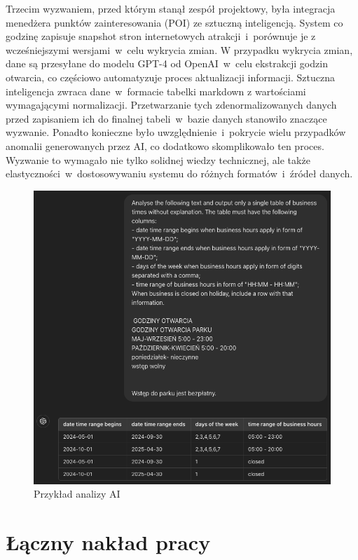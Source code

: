 Trzecim wyzwaniem, przed którym stanął zespół projektowy, była integracja menedżera punktów zainteresowania (POI) ze sztuczną inteligencją.
System co godzinę zapisuje snapshot stron internetowych atrakcji~i~porównuje je z wcześniejszymi wersjami~w~celu wykrycia zmian.
W przypadku wykrycia zmian, dane są przesyłane do modelu GPT-4 od OpenAI~w~celu ekstrakcji godzin otwarcia, co częściowo automatyzuje proces aktualizacji informacji.
Sztuczna inteligencja zwraca dane~w~formacie tabelki markdown z wartościami wymagającymi normalizacji.
Przetwarzanie tych zdenormalizowanych danych przed zapisaniem ich do finalnej tabeli~w~bazie danych stanowiło znaczące wyzwanie.
Ponadto konieczne było uwzględnienie~i~pokrycie wielu przypadków anomalii generowanych przez AI, co dodatkowo skomplikowało ten proces.
Wyzwanie to wymagało nie tylko solidnej wiedzy technicznej, ale także elastyczności~w~dostosowywaniu systemu do różnych formatów~i~źródeł danych.

\begin{figure}[H]
    \centering
    \includegraphics[width=1\textwidth]{attachments/t2}
    \caption{Przykład analizy AI}
\end{figure}

\section{Łączny nakład pracy}
\label{sec:laczny-naklad-pracy}

